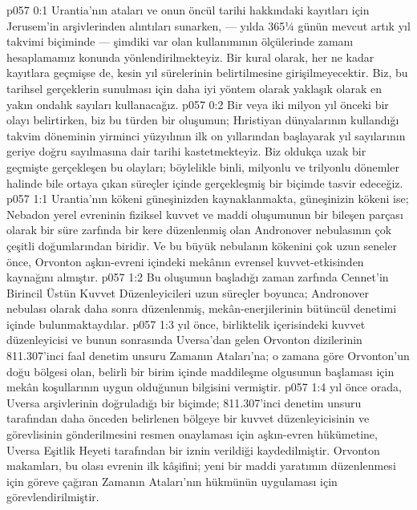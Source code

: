 \vs p057 0:1 Urantia’nın ataları ve onun öncül tarihi hakkındaki kayıtları için Jerusem’in arşivlerinden alıntıları sunarken, --- yılda 365¼ günün mevcut artık yıl takvimi biçiminde --- şimdiki var olan kullanımının ölçülerinde zamanı hesaplamamız konunda yönlendirilmekteyiz. Bir kural olarak, her ne kadar kayıtlara geçmişse de, kesin yıl sürelerinin belirtilmesine girişilmeyecektir. Biz, bu tarihsel gerçeklerin sunulması için daha iyi yöntem olarak yaklaşık olarak en yakın ondalık sayıları kullanacağız.
\vs p057 0:2 Bir veya iki milyon yıl önceki bir olayı belirtirken, biz bu türden bir oluşumun; Hıristiyan dünyalarının kullandığı takvim döneminin yirminci yüzyılının ilk on yıllarından başlayarak yıl sayılarının geriye doğru sayılmasına dair tarihi kastetmekteyiz. Biz oldukça uzak bir geçmişte gerçekleşen bu olayları; böylelikle binli, milyonlu ve trilyonlu dönemler halinde bile ortaya çıkan süreçler içinde gerçekleşmiş bir biçimde tasvir edeceğiz.
\vs p057 1:1 Urantia’nın kökeni güneşinizden kaynaklanmakta, güneşinizin kökeni ise; Nebadon yerel evreninin fiziksel kuvvet ve maddi oluşumunun bir bileşen parçası olarak bir süre zarfında bir kere düzenlenmiş olan Andronover nebulasının çok çeşitli doğumlarından biridir. Ve bu büyük nebulanın kökenini çok uzun seneler önce, Orvonton aşkın\hyp{}evreni içindeki mekânın evrensel kuvvet\hyp{}etkisinden kaynağını almıştır.
\vs p057 1:2 Bu oluşumun başladığı zaman zarfında Cennet’in Birincil Üstün Kuvvet Düzenleyicileri uzun süreçler boyunca; Andronover nebulası olarak daha sonra düzenlenmiş, mekân\hyp{}enerjilerinin bütüncül denetimi içinde bulunmaktaydılar.
\vs p057 1:3  yıl önce, birliktelik içerisindeki kuvvet düzenleyicisi ve bunun sonrasında Uversa’dan gelen Orvonton dizilerinin 811.307’inci faal denetim unsuru Zamanın Ataları’na; o zamana göre Orvonton’un doğu bölgesi olan, belirli bir birim içinde maddileşme olgusunun başlaması için mekân koşullarının uygun olduğunun bilgisini vermiştir.
\vs p057 1:4  yıl önce orada, Uversa arşivlerinin doğruladığı bir biçimde; 811.307’inci denetim unsuru tarafından daha önceden belirlenen bölgeye bir kuvvet düzenleyicisinin ve görevlisinin gönderilmesini resmen onaylaması için aşkın\hyp{}evren hükümetine, Uversa Eşitlik Heyeti tarafından bir iznin verildiği kaydedilmiştir. Orvonton makamları, bu olası evrenin ilk kâşifini; yeni bir maddi yaratımın düzenlenmesi için göreve çağıran Zamanın Ataları’nın hükmünün uygulaması için görevlendirilmiştir.
